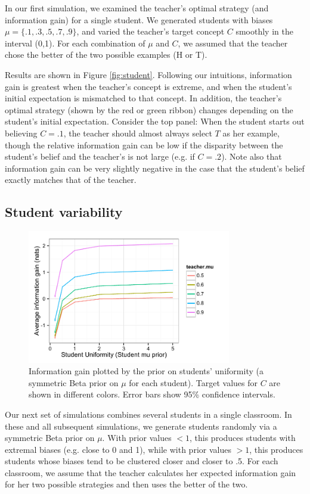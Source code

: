 \documentclass[10pt,letterpaper]{article}
\begin{document}
In our first simulation, we examined the teacher's optimal strategy (and information gain) for a single student. We generated students with biases $\mu= \{.1, .3, .5, .7, .9\}$, and varied the teacher's target concept $C$ smoothly in the interval (0,1). For each combination of $\mu$ and $C$, we assumed that the teacher chose the better of the two possible examples (H or T). 

Results are shown in Figure \ref{fig:student}. Following our intuitions, information gain is greatest when the teacher's concept is extreme, and when the student's initial expectation is mismatched to that concept. In addition, the teacher's optimal strategy (shown by the red or green ribbon) changes depending on the student's initial expectation. Consider the top panel: When the student starts out believing $C=.1$, the teacher should almost always select $T$ as her example, though the relative information gain can be low if the disparity between the student's belief and the teacher's is not large (e.g. if $C=.2$). Note also that information gain can be very slightly negative in the case that the student's belief exactly matches that of the teacher.

\subsection{Student variability}

\begin{figure}[t]
\begin{center}
\includegraphics[width=3.5in]{figures/student_uniformity.pdf}
\end{center}
\caption{\label{fig:uniformity} Information gain plotted by the prior on students' uniformity (a symmetric Beta prior on $\mu$ for each student). Target values for $C$ are shown in different colors. Error bars show 95\% confidence intervals.}
\end{figure}

Our next set of simulations combines several students in a single classroom. In these and all subsequent simulations, we generate students randomly via a symmetric Beta prior on $\mu$. With prior values $< 1$, this produces students with extremal biases (e.g. close to 0 and 1), while with prior values $>1$, this produces students whose biases tend to be clustered closer and closer to .5. For each classroom, we assume that the teacher calculates her expected information gain for her two possible strategies and then uses the better of the two. 
\end{document}
